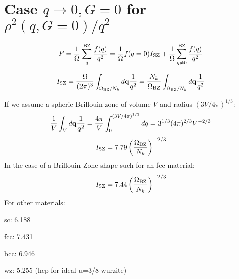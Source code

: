 \documentclass[fleqn]{article}
\begin{document}
\newpage


\section{Case $q \rightarrow 0, G=0$ for $\rho^2(q,G=0) / q^2$}

\[
F = \frac{1}{\Omega} \sum_q^{\rm BZ} \frac{f(q)}{q^2} = 
\frac{1}{\Omega} f(q=0) I_{\rm SZ} + \frac{1}{\Omega} \sum_{q\ne 0}^{\rm BZ} \frac{f(q)}{q^2} 
\]

\[
I_{\rm SZ} = \frac{\Omega}{(2\pi)^3} \int_{\Omega_{\rm BZ}/N_k} d{\bf q} \frac{1}{q^2} =
\frac{N_k}{\Omega_{\rm BZ}} \int_{\Omega_{\rm BZ}/N_k} d{\bf q} \frac{1}{q^2}
\]

If we assume a spheric Brillouin zone of volume $V$ and radius $(3 V/4\pi)^{1/3}$:
\[
\frac{1}{V} \int_V d{\bf q} \frac{1}{q^2} = \frac{4\pi}{V} \int_0^{(3 V/4\pi)^{1/3}} dq
= 3^{1/3} (4\pi)^{2/3} V^{-2/3} 
\]
\[
I_{\rm SZ} = 7.79 \left( \frac{\Omega_{\rm BZ}}{N_k}\right)^{-2/3}
\]
In the case of a Brillouin Zone shape such for an fcc material:
\[
I_{\rm SZ} = 7.44 \left( \frac{\Omega_{\rm BZ}}{N_k}\right)^{-2/3}
\]
For other materials:

sc: 6.188

fcc: 7.431

bcc: 6.946

wz: 5.255 (hcp for ideal u=3/8 wurzite)
\end{document}
